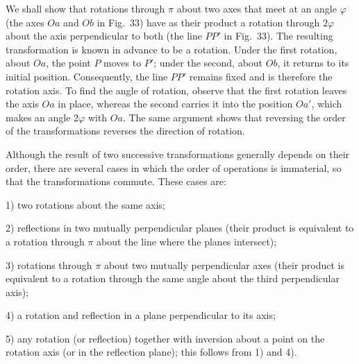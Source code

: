We shall show that rotations through $\pi$ about two axes that meet at an angle $\varphi$ (the axes $Oa$ and $Ob$ in Fig.~33) have as their product a rotation through $2\varphi$ about the axis perpendicular to both (the line $PP'$ in Fig.~33). The resulting transformation is known in advance to be a rotation. Under the first rotation, about $Oa$, the point $P$ moves to $P'$; under the second, about $Ob$, it returns to its initial position. Consequently, the line $PP'$ remains fixed and is therefore the rotation axis. To find the angle of rotation, observe that the first rotation leaves the axis $Oa$ in place, whereas the second carries it into the position $Oa'$, which makes an angle $2\varphi$ with $Oa$. The same argument shows that reversing the order of the transformations reverses the direction of rotation.

\begin{figure}[ht]
\centering
{}
\caption{}
\label{fig:91-33}
\end{figure}

Although the result of two successive transformations generally depends on their order, there are several cases in which the order of operations is immaterial, so that the transformations commute. These cases are:

1) two rotations about the same axis;

2) reflections in two mutually perpendicular planes (their product is equivalent to a rotation through $\pi$ about the line where the planes intersect);

3) rotations through $\pi$ about two mutually perpendicular axes (their product is equivalent to a rotation through the same angle about the third perpendicular axis);

4) a rotation and reflection in a plane perpendicular to its axis;

5) any rotation (or reflection) together with inversion about a point on the rotation axis (or in the reflection plane); this follows from 1) and 4).
